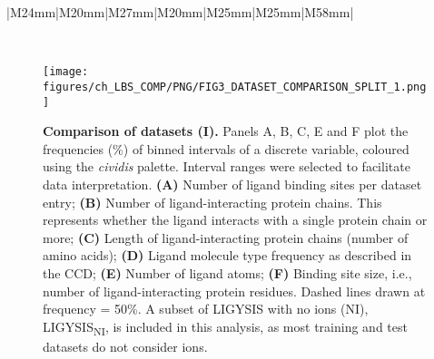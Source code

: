 \begin{landscape}
\begin{longtable}{|M{24mm}|M{20mm}|M{27mm}|M{20mm}|M{25mm}|M{25mm}|M{58mm}|}
\caption[Datasets summary statistics]{\textbf{Datasets summary statistics.} \# Structures, \# Sites and \# Ligands represent the number of PDB structures, ligand sites and total number of ligands for each dataset. For LIGYSIS and LIGYSIS\textsubscript{NI}, 3448 and 2775, are the number of structural segments, each represented by a single chain. For each segment, biologically relevant ligands across structures were considered: $N$ = 23,321 (LIGYSIS) and $N$ = 19,012 (LIGYSIS\textsubscript{NI}). The number of ligands is not equal to the number of sites for LIGYSIS, as ligands from multiple structures of the same protein are aggregated into unique sites. Overlap is the number of LIGYSIS binding sites represented by at least one protein-ligand complex for a given dataset. Percentage relative to LIGYSIS also reported. Methods represents the ligand site predictors that use these datasets for training or test. For \# Structures, \# Sites and \# Ligands, highest values are coloured in bold blue font and lowest in orange. This is the other way around for Overlap.}
\label{tab:datasets_comp}\\
\end{longtable}
\end{landscape}

\FloatBarrier

\begin{figure}[ht!]
    \centering
    \texttt{[image: figures/ch\_LBS\_COMP/PNG/FIG3\_DATASET\_COMPARISON\_SPLIT\_1.png]}
    \caption[Comparison of datasets (I)]{\textbf{Comparison of datasets (I).} Panels A, B, C, E and F plot the frequencies (\%) of binned intervals of a discrete variable, coloured using the \textit{cividis} palette. Interval ranges were selected to facilitate data interpretation. \textbf{(A)} Number of ligand binding sites per dataset entry; \textbf{(B)} Number of ligand-interacting protein chains. This represents whether the ligand interacts with a single protein chain or more; \textbf{(C)} Length of ligand-interacting protein chains (number of amino acids); \textbf{(D)} Ligand molecule type frequency as described in the CCD; \textbf{(E)} Number of ligand atoms; \textbf{(F)} Binding site size, i.e., number of ligand-interacting protein residues. Dashed lines drawn at frequency = 50\%. A subset of LIGYSIS with no ions (NI), LIGYSIS\textsubscript{NI}, is included in this analysis, as most training and test datasets do not consider ions.}
    \label{fig:dataset_comp_1}
\end{figure}

